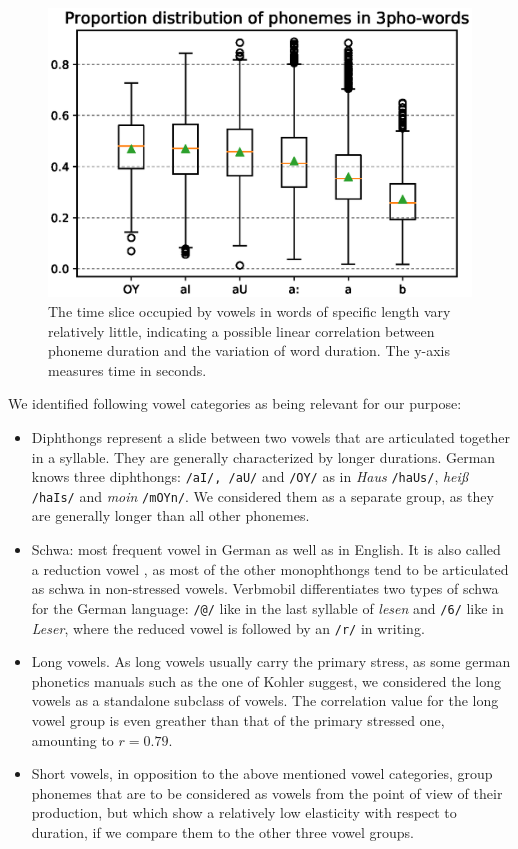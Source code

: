 \documentclass[11pt,a4paper]{scrbook}
\begin{document}
\begin{figure}[htbp]
	\includegraphics[width=.55\linewidth]{../Graphen/box3_oyauaiaab.eps}
	\centering
	\caption[Proportions of diphthong in 3-phoneme-words]{The time slice occupied by vowels in words of specific length  vary relatively little, indicating a possible linear correlation between phoneme duration and the variation of word duration. The y-axis measures time in seconds.}
	\label{fig:boxplot_prop}
\end{figure}

We identified following vowel categories as being relevant for our purpose:

\begin{itemize}
	\item Diphthongs represent a slide between two vowels that are articulated together in a syllable. They are generally characterized by longer durations. German knows three diphthongs: \texttt{/aI/, /aU/} and \texttt{/OY/} as in \textit{Haus} \texttt{/haUs/},  \textit{heiß} \texttt{/haIs/} and \textit{moin} \texttt{/mOYn/}. We considered them as a separate group, as they are generally longer than all other phonemes.
	\item Schwa: most frequent vowel in German as well as in English. It is also called a reduction vowel \cite{Kohler1995}, as most of the other monophthongs tend to be articulated as schwa in non-stressed vowels. Verbmobil differentiates two types of schwa for the German language: \texttt{/@/} like in the last syllable of \textit{lesen} and \texttt{/6/} like in \textit{Leser}, where the reduced vowel is followed by an \texttt{/r/} in writing.
	\item Long vowels. As long vowels usually carry the primary stress, as some german phonetics manuals such as the one of Kohler \cite{Kohler1995} suggest, we considered the long vowels as a standalone subclass of vowels. The correlation value for the long vowel group is even greather than that of the primary stressed one, amounting to $r = 0.79$.
	\item Short vowels, in opposition to the above mentioned vowel categories, group phonemes that are to be considered as vowels from the point of view of their production, but which show a relatively low elasticity with respect to duration, if we compare them to the other three vowel groups.
\end{itemize}
\end{document}
